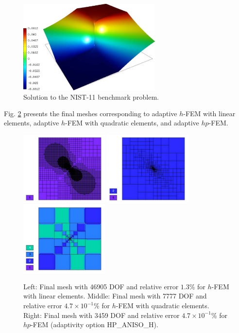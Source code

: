 \documentclass[12pt]{elsarticle}
\begin{document}
\begin{figure}[H]
\centering
\includegraphics[height=4.7cm]{mafig65.pdf}
\caption{Solution to the NIST-11 benchmark problem.}
\label{fig:sln-nist11}
\end{figure}

Fig. \ref{fig:nist-11-hp-aniso} presents the final meshes corresponding to adaptive $h$-FEM with
linear elements, adaptive $h$-FEM with quadratic elements, and adaptive $hp$-FEM.

\begin{figure}[H]
\centering
\includegraphics[height=3.7cm]{mafig66.pdf}
\includegraphics[height=3.7cm]{mafig67.pdf}
\includegraphics[height=3.7cm]{mafig68.pdf}
\caption{
Left: Final mesh with 46905 DOF and relative error $1.3$\% for $h$-FEM with linear elements.
Middle: Final mesh with 7777 DOF and relative error $4.7\times10^{-1}$\% for $h$-FEM with quadratic elements.
Right: Final mesh with 3459 DOF and relative error $4.7\times10^{-1}$\% for $hp$-FEM (adaptivity option HP\_ANISO\_H).}
\label{fig:nist-11-hp-aniso}
\end{figure}
\end{document}
